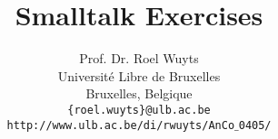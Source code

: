 \let\wholebook=\relax


\title{Smalltalk Exercises}
\author{
Prof. Dr. Roel Wuyts\\
{\small Universit\'{e} Libre de Bruxelles} \\
{\small Bruxelles, Belgique} \\
{\small {\tt \{roel.wuyts\}@ulb.ac.be}}\\
{\small {\tt http://www.ulb.ac.be/di/rwuyts/AnCo$\_$0405/}}
}

\maketitle






%
%
%
%
\appendix


